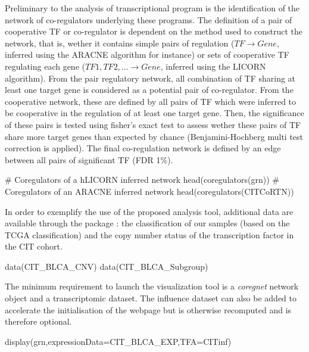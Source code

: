 \documentclass[12pt]{article}
\begin{document}
Preliminary to the analysis of transcriptional program is the
identification of the network of co-regulators underlying these
programs. The definition of a pair of cooperative TF or co-regulator is
dependent on the method used to construct the network, that is, wether
it contains simple pairs of regulation ($TF \rightarrow Gene$, inferred using the
ARACNE algorithm for instance) or sets of cooperative TF regulating each
gene (${TF1,TF2,...} \rightarrow Gene$, inferred using the LICORN algorithm). From
the pair regulatory network, all combination of TF sharing at least one
target gene is considered as a potential pair of co-regulator. From the
cooperative network, these are defined by all pairs of TF which were
inferred to be cooperative in the regulation of at least one target
gene. Then, the significance of these pairs is tested using fisher's
exact test to assess wether these pairs of TF share more target genes
than expected by chance (Benjamini-Hochberg multi test correction is
applied). The final co-regulation network is defined by an edge between
all pairs of significant TF (FDR 1\%).

\begin{Schunk}
\begin{Sinput}
    # Coregulators of a hLICORN  inferred network
    head(coregulators(grn))
    #  Coregulators of an ARACNE inferred network
    head(coregulators(CITCoRTN))
\end{Sinput}
\end{Schunk}
    
    In order to exemplify the use of the proposed analysis tool, additional
data are available through the package : the classification of our
samples (based on the TCGA classification) and the copy number status of
the transcription factor in the CIT cohort.
  
 \begin{Schunk}
\begin{Sinput}
    data(CIT_BLCA_CNV)
    data(CIT_BLCA_Subgroup)
\end{Sinput}
\end{Schunk}

The minimum requirement to launch the visualization tool is a \textit{coregnet}
network object and a transcriptomic dataset. The influence dataset can
also be added to accelerate the initialisation of the webpage but is
otherwise recomputed and is therefore optional.

 \begin{Schunk}
\begin{Sinput}
    display(grn,expressionData=CIT_BLCA_EXP,TFA=CITinf)
\end{Sinput}
\end{Schunk}
\end{document}

